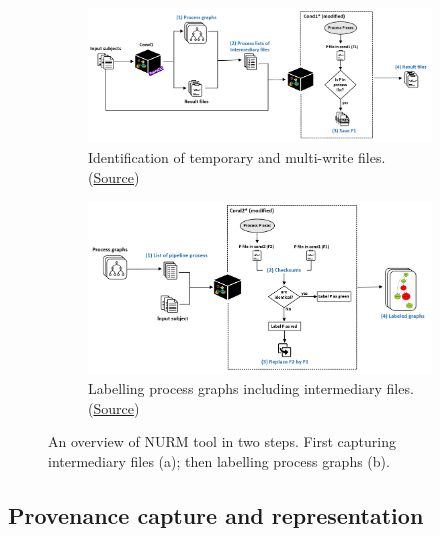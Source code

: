 \documentclass[a4paper,num-refs]{oup-contemporary}
\begin{document}
\begin{figure}
  \centering
  \begin{subfigure}{\columnwidth}
    \centering
    \includegraphics[width=1\columnwidth]{images/fig1-a}
    \caption{Identification of temporary and multi-write files.
    (\href{https://docs.google.com/drawings/d/1rsbFwPjNPNMRhXUl4RSK3G0OaiJC7K-buiHN0hPD8eQ/edit?usp=sharing}{Source})}
    \label{fig:overview-capturing}
  \end{subfigure}
   \begin{subfigure}{\columnwidth}
    \centering
     \includegraphics[width=1\columnwidth]{images/fig1-b}
     \caption{Labelling process graphs including intermediary files.
     (\href{https://docs.google.com/drawings/d/1yblYuKWAD18aJe5JxBu2h1EysyoQA3YrsQj-1T3s0l8/edit?usp=sharing}{Source})}
     \label{fig:overview-labelling}
   \end{subfigure}
   \caption{An overview of NURM tool in two steps. First capturing intermediary files (a); then
            labelling process graphs (b).}
   \label{fig:overview}
  \end{figure}

\subsection{Provenance capture and representation}
\end{document}
